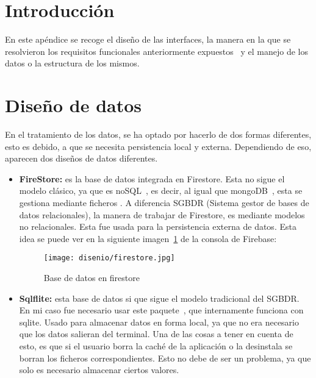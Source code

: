
\section{Introducción}\label{diseño}
En este apéndice se recoge el diseño de las interfaces, la manera en la que se resolvieron los requisitos funcionales anteriormente expuestos~\pageref{requisitos} y el manejo de los datos o la estructura de los mismos.

\section{Diseño de datos}
En el tratamiento de los datos, se ha optado por hacerlo de dos formas diferentes, esto es debido, a que se necesita persistencia local y externa. Dependiendo de eso, aparecen dos diseños de datos diferentes.

\begin{itemize}
	\item \textbf{FireStore:} es la base de datos integrada en Firestore. Esta no sigue el modelo clásico, ya que es noSQL~\cite{wiki:nosql}, es decir, al igual que mongoDB~\cite{wiki:mongodb}, esta se gestiona mediante ficheros . A diferencia SGBDR (Sistema gestor de bases de datos relacionales), la manera de trabajar de Firestore, es mediante modelos no relacionales. Esta fue usada para la persistencia externa de datos. Esta idea se puede ver en la siguiente imagen~\ref{fig:firestore} de la consola de Firebase:
	
	\begin{figure}[H]
		\centering
		\texttt{[image: disenio/firestore.jpg]}
		\caption{Base de datos en firestore}\label{fig:firestore}
	\end{figure}

	\item\label{sqlflite} \textbf{Sqlflite:} esta base de datos si que sigue el modelo tradicional del SGBDR. En mi caso fue necesario usar este paquete~\cite{package:sqlflite}, que internamente funciona con sqlite. Usado para almacenar datos en forma local, ya que no era necesario que los datos salieran del terminal. Una de las cosas a tener en cuenta de esto, es que si el usuario borra la caché de la aplicación o la desinstala se borran los ficheros correspondientes. Esto no debe de ser un problema, ya que solo es necesario almacenar ciertos valores.
	
\end{itemize}

